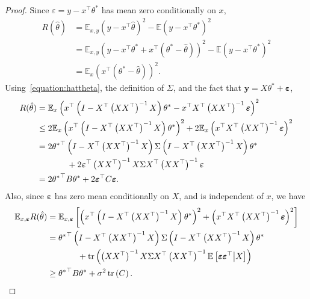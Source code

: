 \documentclass[11pt,notitlepage]{article}
\newcommand\E {\mathbb{E}}
\newcommand\Expect{\E}
\newcommand\bs {\boldsymbol}
\newcommand\eps {\varepsilon}
\newcommand\tr {\ensuremath{\operatorname{\mathrm{tr}}}}
\begin{document}
\begin{proof}
  Since $\eps=y-x^\top\theta^*$ has mean zero conditionally on $x$,
    \begin{align*}
      R(\hat\theta)
        & = \Expect_{x,y}\left(y-x^\top\hat\theta\right)^2
          - \Expect\left(y-x^\top\theta^*\right)^2 \\
        & = \Expect_{x,y}\left(y-x^\top\theta^*
          + x^\top\left(\theta^*-\hat\theta\right)\right)^2
          - \Expect\left(y-x^\top\theta^*\right)^2 \\
        & = \E_{x} \left(x^\top\left(\theta^*-\hat\theta\right)\right)^2.
    \end{align*}
  Using~\eqref{equation:hattheta}, the definition of $\Sigma$, and the
  fact that $\bs{y}=X\theta^*+\bs{\eps}$,
    \begin{align*}
      R(\hat\theta)
        & = \E_{x} \left(x^\top\left(I - X^\top \left(X X^\top \right)^{-1}
          X\right)\theta^\ast - x^\top X^\top \left(X X^\top \right)^{-1}
          \bs{\eps}\right)^2 \\
        &\leq 2 \E_{x} \left(x^\top\left(I - X^\top \left(X X^\top \right)^{-1}
          X\right)\theta^\ast\right)^2 
          + 2 \E_{x} \left(x^\top X^\top \left(X X^\top
          \right)^{-1}\bs{\eps}\right)^2\\
        & = 2{\theta^\ast}^\top \left(I - X^\top \left(X X^\top \right)^{-1}X\right)
          \Sigma\left(I - X^\top \left(X X^\top \right)^{-1}X\right) \theta^\ast \\
       & \hspace{0.5in}
          +2\bs{\eps}^\top \left(X X^\top \right)^{-1}X\Sigma X^\top
          \left(X X^\top \right)^{-1}\bs{\eps} \\
        & = 2{\theta^\ast}^\top B \theta^\ast +2\bs{\eps}^\top
        C\bs{\eps}.
  \end{align*}
Also, since $\bs{\eps}$ has zero mean conditionally on $X$, and is independent of $x$, we have
    \begin{align*}
      \Expect_{x,\bs{\eps}} R(\hat\theta)
        & = \E_{x,\bs{\eps}}\left[
          \left(x^\top\left(I - X^\top \left(X X^\top \right)^{-1}
          X\right)\theta^\ast\right)^2 
          + \left(x^\top X^\top \left(X X^\top \right)^{-1}\bs{\eps}\right)^2\right]\\
        & = {\theta^\ast}^\top \left(I - X^\top \left(X X^\top \right)^{-1}X\right)
          \Sigma\left(I - X^\top \left(X X^\top \right)^{-1}X\right) \theta^\ast \\
       & \hspace{0.5in}
          +\tr\left(\left(X X^\top \right)^{-1}X\Sigma X^\top \left(X X^\top \right)^{-1}
          \Expect\left[\bs{\eps}\bs{\eps}^\top\middle|X\right]\right) \\
        & \geq {\theta^\ast}^\top B \theta^\ast + \sigma^2 \tr\left(C\right).
    \end{align*}
\end{proof}
\end{document}
